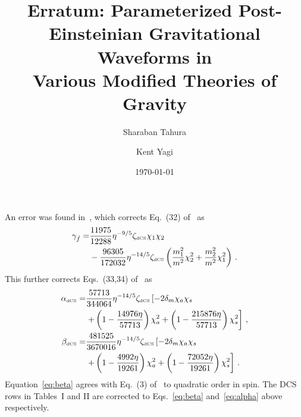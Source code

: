 \documentclass[prd,twocolumn,nofootinbib]{revtex4-1}
\newcommand{\DCS}{{\mbox{\tiny dCS}}}
\begin{document}
\title{Erratum: Parameterized Post-Einsteinian Gravitational Waveforms in \\ Various Modified Theories of Gravity}

\author{Sharaban Tahura}

\author{Kent Yagi}


\date{\today}




\maketitle



An error was found in~\cite{Yagi:2012vf}, which corrects Eq.~(32) of~\cite{Tahura:2018zuq} as
%
 \begin{align}\label{dcs:gamma_fdot}
\gamma_{\dot{f}}=& \frac{11975}{12288}\eta^{-9/5}\zeta_{\DCS}\chi_1 \chi_2 \nonumber \\
&-\frac{96305}{172032 }\eta^{-14/5}\zeta_{\DCS} \left(\frac{m_1^2}{m^2}\chi_2^2+\frac{m_2^2}{m^2}\chi_1^2\right)\,.
 \end{align}
This further corrects Eqs.~(33,34) of~\cite{Tahura:2018zuq} as
%
\allowdisplaybreaks
 \begin{align}
 \label{eq:alpha}
 \alpha_{\DCS}=&\frac{57713}{344064}\eta ^{-14/5}\zeta_{\DCS} \left[-2 \delta_m \chi_a \chi_s \right. \nonumber\\ 
 &\left. +\left(1-\frac{14976 \eta }{57713}\right) \chi_a^2+\left(1-\frac{215876 \eta }{57713}\right) \chi_s^2\right]\,, \\
\label{eq:beta}
 \beta_{\DCS}=&\frac{481525}{3670016}\eta ^{-14/5} \zeta_{\DCS} \left[-2 \delta_m \chi_a \chi_s \right.\nonumber\\ 
 &\left. +\left(1-\frac{4992 \eta }{19261}\right)\chi_a^2 +\left(1-\frac{72052 \eta }{19261}\right)\chi_s^2\right]\,.
 \end{align}
Equation~\eqref{eq:beta} agrees with Eq.~(3) of~\cite{Nair:2019iur} to quadratic order in spin. The 
DCS rows in Tables~I and II are corrected to Eqs.~\eqref{eq:beta} and~\eqref{eq:alpha} above respectively.

 
 
\end{document}
